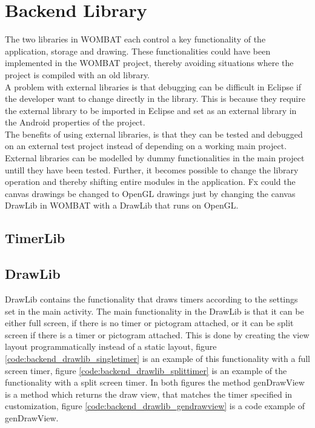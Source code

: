 \section{Backend Library}
\label{sec:backend}
The two libraries in WOMBAT each control a key functionality of the application, storage and drawing.
These functionalities could have been implemented in the WOMBAT project, thereby avoiding situations where the project is compiled with an old library.\\
A problem with external libraries is that debugging can be difficult in Eclipse if the developer want to change directly in the library. This is because they require the external library to be imported in Eclipse and set as an external library in the Android properties of the project.\\
The benefits of using external libraries, is that they can be tested and debugged on an external test project instead of depending on a working main project.
External libraries can be modelled by dummy functionalities in the main project untill they have been tested.
Further, it becomes possible to change the library operation and thereby shifting entire modules in the application.
Fx could the canvas drawings be changed to OpenGL drawings just by changing the canvas DrawLib in WOMBAT with a DrawLib that runs on OpenGL.


\subsection{TimerLib}

\subsection{DrawLib}
DrawLib contains the functionality that draws timers according to the settings set in the main activity.
The main functionality in the DrawLib is that it can be either full screen, if there is no timer or pictogram attached, or it can be split screen if there is a timer or pictogram attached.
This is done by creating the view layout programmatically instead of a static layout, figure \ref{code:backend_drawlib_singletimer} is an example of this functionality with a full screen timer, figure \ref{code:backend_drawlib_splittimer} is an example of the functionality with a split screen timer.
In both figures the method genDrawView is a method which returns the draw view, that matches the timer specified in customization, figure \ref{code:backend_drawlib_gendrawview} is a code example of genDrawView.


